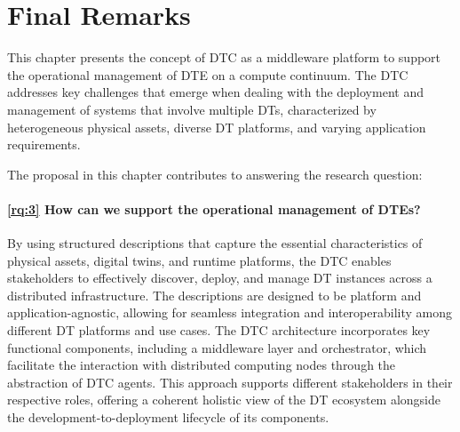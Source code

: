 \section{Final Remarks}

This chapter presents the concept of \acl{DTC} as a middleware platform to support the operational management of \ac{DTE} on a compute continuum. 
%
The \ac{DTC} addresses key challenges that emerge when dealing with the deployment and management of systems that involve multiple \acp{DT}, characterized by heterogeneous physical assets, diverse DT platforms, and varying application requirements.

The proposal in this chapter contributes to answering the research question:

\paragraph{\ref{rq:3} How can we support the operational management of DTEs?}

By using structured descriptions that capture the essential characteristics of physical assets, digital twins, and runtime platforms, the DTC enables stakeholders to effectively discover, deploy, and manage DT instances across a distributed infrastructure.
%
The descriptions are designed to be platform and application-agnostic, allowing for seamless integration and interoperability among different DT platforms and use cases.
%
The DTC architecture incorporates key functional components, including a middleware layer and orchestrator, which facilitate the interaction with distributed computing nodes through the abstraction of DTC agents. 
%
This approach supports different stakeholders in their respective roles, offering a coherent holistic view of the DT ecosystem alongside the development-to-deployment lifecycle of its components. 

